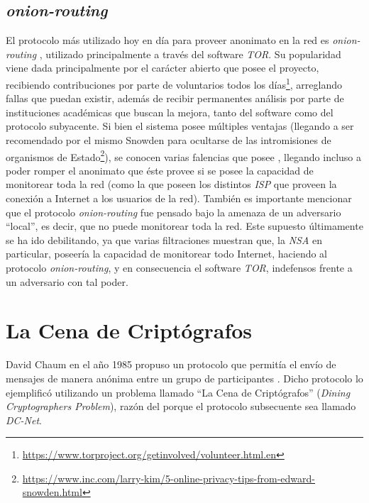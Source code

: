 \subsection{\emph{onion-routing}}

El protocolo más utilizado hoy en día para proveer anonimato en la red es \emph{onion-routing} 
\cite{reed1998anonymous}, utilizado principalmente a través del software \emph{TOR}. Su popularidad viene dada principalmente por 
el carácter abierto que posee el proyecto, recibiendo contribuciones por parte de voluntarios todos los 
días\footnote{\url{https://www.torproject.org/getinvolved/volunteer.html.en}}, arreglando fallas que puedan existir, además de recibir 
permanentes análisis por parte de instituciones académicas que buscan la mejora, tanto del software como del protocolo subyacente. 
Si bien el sistema posee múltiples ventajas (llegando a ser recomendado por el mismo Snowden para ocultarse de las intromisiones de 
organismos de Estado\footnote{\url{https://www.inc.com/larry-kim/5-online-privacy-tips-from-edward-snowden.html}}), 
se conocen varias falencias que posee \cite{syverson2001towards}, llegando incluso a poder romper el anonimato 
que éste provee si se posee la capacidad de monitorear toda la red (como la que poseen los distintos \emph{ISP} que proveen la conexión a 
Internet a los usuarios de la red). También es importante mencionar que el protocolo \emph{onion-routing} fue pensado bajo la amenaza 
de un adversario ``local'', es decir, que no puede monitorear toda la red. Este supuesto últimamente se ha ido debilitando, ya que 
varias filtraciones muestran que, la \emph{NSA} en particular, poseería la capacidad de monitorear todo Internet, haciendo al protocolo 
\emph{onion-routing}, y en consecuencia el software \emph{TOR}, indefensos frente a un adversario con tal poder.

\section{La Cena de Criptógrafos}

David Chaum en el año 1985 propuso un protocolo que permitía el envío de mensajes de manera anónima entre un grupo de participantes 
\cite{Chaum:1985:SWI:4372.4373, chaum1988dining}. Dicho protocolo lo ejemplificó utilizando un problema llamado ``La Cena de Criptógrafos'' 
(\emph{Dining Cryptographers Problem}), razón del porque el protocolo subsecuente sea llamado \emph{DC-Net}.


